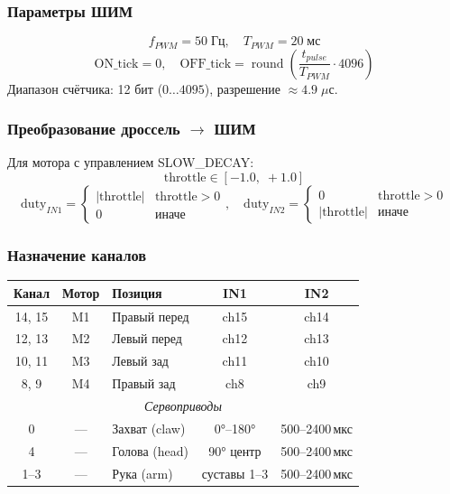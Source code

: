 \documentclass[12pt, a4paper]{article}
\begin{document}
\subsubsection{Параметры ШИМ}
\begin{equation}
  f_{PWM} = 50\;\text{Гц}, \quad T_{PWM} = 20\;\text{мс}
\end{equation}
\begin{equation}
  \text{ON\_tick} = 0, \quad
  \text{OFF\_tick} = \operatorname{round}\!\left(\frac{t_{pulse}}{T_{PWM}} \cdot 4096\right)
\end{equation}
Диапазон счётчика: 12 бит ($0 \ldots 4095$), разрешение $\approx 4.9\;\mu$с.

\subsubsection{Преобразование дроссель $\to$ ШИМ}
Для мотора с управлением SLOW\_DECAY:
\begin{equation}
  \text{throttle} \in [-1.0,\; +1.0]
\end{equation}
\begin{equation}
  \text{duty}_{IN1} =
  \begin{cases}
    |\text{throttle}| & \text{throttle} > 0 \\
    0 & \text{иначе}
  \end{cases},\quad
  \text{duty}_{IN2} =
  \begin{cases}
    0 & \text{throttle} > 0 \\
    |\text{throttle}| & \text{иначе}
  \end{cases}
\end{equation}

\subsubsection{Назначение каналов}
\begin{center}
\begin{tabular}{cclcc}
\toprule
\textbf{Канал} & \textbf{Мотор} & \textbf{Позиция} & \textbf{IN1} & \textbf{IN2} \\
\midrule
14, 15 & M1 & Правый перед  & ch15 & ch14 \\
12, 13 & M2 & Левый перед   & ch12 & ch13 \\
10, 11 & M3 & Левый зад     & ch11 & ch10 \\
 8,  9 & M4 & Правый зад    & ch8  & ch9  \\
\midrule
\multicolumn{5}{c}{\textit{Сервоприводы}} \\
\midrule
0 & — & Захват (claw)   & 0°–180° & 500–2400\,мкс \\
4 & — & Голова (head)   & 90° центр & 500–2400\,мкс \\
1–3 & — & Рука (arm)     & суставы 1–3 & 500–2400\,мкс \\
\bottomrule
\end{tabular}
\end{center}
\end{document}
